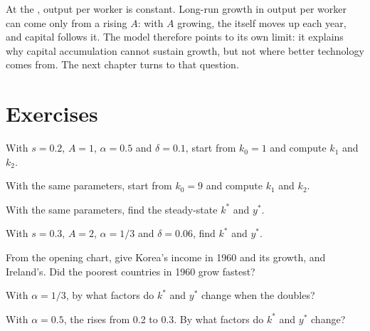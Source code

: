 At the , output per worker is constant. Long-run growth in output per worker can come only from a rising $A$: with $A$ growing, the  itself moves up
each year, and capital follows it. The model therefore points to its own limit: it explains why capital accumulation cannot sustain growth, but not where better technology
comes from. The next chapter turns to that question.

\section{Exercises}

\begin{exercise}[$\star$]\label{exo:g12:solow-first-look:1}
With $s = 0.2$, $A = 1$, $\alpha = 0.5$ and $\delta = 0.1$, start from $k_0 = 1$ and compute $k_1$ and $k_2$.
\end{exercise}

\begin{exercise}[$\star$]\label{exo:g12:solow-first-look:2}
With the same parameters, start from $k_0 = 9$ and compute $k_1$ and $k_2$.
\end{exercise}

\begin{exercise}[$\star$]\label{exo:g12:solow-first-look:3}
With the same parameters, find the steady-state $k^*$ and $y^*$.
\end{exercise}

\begin{exercise}[$\star$]\label{exo:g12:solow-first-look:4}
With $s = 0.3$, $A = 2$, $\alpha = 1/3$ and $\delta = 0.06$, find $k^*$ and $y^*$.
\end{exercise}

\begin{exercise}[$\star$]\label{exo:g12:solow-first-look:5}
From the opening chart, give Korea's income in 1960 and its growth, and Ireland's. Did the poorest countries in 1960 grow fastest?
\end{exercise}

\begin{exercise}[$\star\star$]\label{exo:g12:solow-first-look:6}
With $\alpha = 1/3$, by what factors do $k^*$ and $y^*$ change when the  doubles?
\end{exercise}

\begin{exercise}[$\star\star$]\label{exo:g12:solow-first-look:7}
With $\alpha = 0.5$, the  rises from 0.2 to 0.3. By what factors do $k^*$ and $y^*$ change?
\end{exercise}

